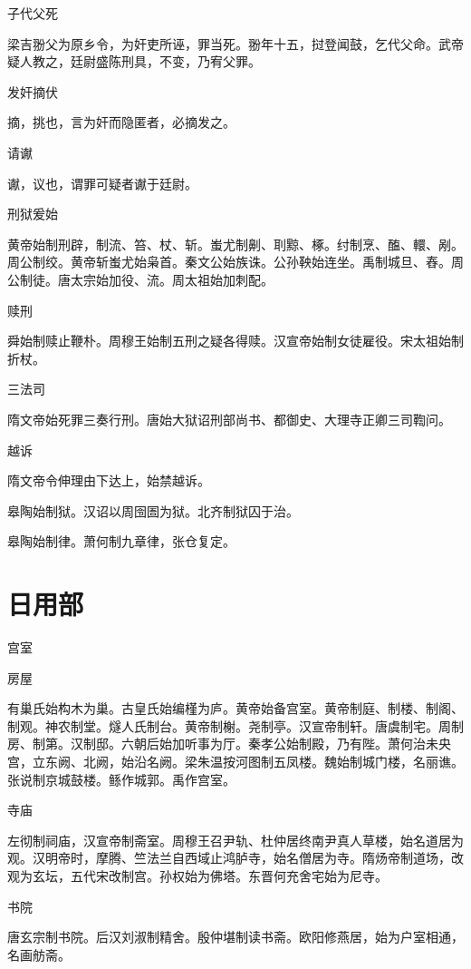 \documentclass[a4paper,12pt,UTF8,twoside]{ctexbook}
\begin{document}
    子代父死
    
    梁吉翂父为原乡令，为奸吏所诬，罪当死。翂年十五，挝登闻鼓，乞代父命。武帝疑人教之，廷尉盛陈刑具，不变，乃宥父罪。
    
    发奸摘伏
    
    摘，挑也，言为奸而隐匿者，必摘发之。
    
    请谳
    
    谳，议也，谓罪可疑者谳于廷尉。
    
    刑狱爰始
    
    黄帝始制刑辟，制流、笞、杖、斩。蚩尤制劓、刵黥、椓。纣制烹、醢、轘、剐。周公制绞。黄帝斩蚩尤始枭首。秦文公始族诛。公孙鞅始连坐。禹制城旦、舂。周公制徒。唐太宗始加役、流。周太祖始加刺配。
    
    赎刑
    
    舜始制赎止鞭朴。周穆王始制五刑之疑各得赎。汉宣帝始制女徒雇役。宋太祖始制折杖。
    
    三法司
    
    隋文帝始死罪三奏行刑。唐始大狱诏刑部尚书、都御史、大理寺正卿三司鞫问。
    
    越诉
    
    隋文帝令伸理由下达上，始禁越诉。
    
    皋陶始制狱。汉诏以周囹圄为狱。北齐制狱囚于治。
    
    皋陶始制律。萧何制九章律，张仓复定。
    
    
    \part{日用部}
    
    宫室
    
    房屋
    
    有巢氏始构木为巢。古皇氏始编槿为庐。黄帝始备宫室。黄帝制庭、制楼、制阁、制观。神农制堂。燧人氏制台。黄帝制榭。尧制亭。汉宣帝制轩。唐虞制宅。周制房、制第。汉制邸。六朝后始加听事为厅。秦孝公始制殿，乃有陛。萧何治未央宫，立东阙、北阙，始沿名阙。梁朱温按河图制五凤楼。魏始制城门楼，名丽谯。张说制京城鼓楼。鲧作城郭。禹作宫室。
    
    寺庙
    
    左彻制祠庙，汉宣帝制斋室。周穆王召尹轨、杜仲居终南尹真人草楼，始名道居为观。汉明帝时，摩腾、竺法兰自西域止鸿胪寺，始名僧居为寺。隋炀帝制道场，改观为玄坛，五代宋改制宫。孙权始为佛塔。东晋何充舍宅始为尼寺。
    
    书院
    
    唐玄宗制书院。后汉刘淑制精舍。殷仲堪制读书斋。欧阳修燕居，始为户室相通，名画舫斋。
    
\end{document}

